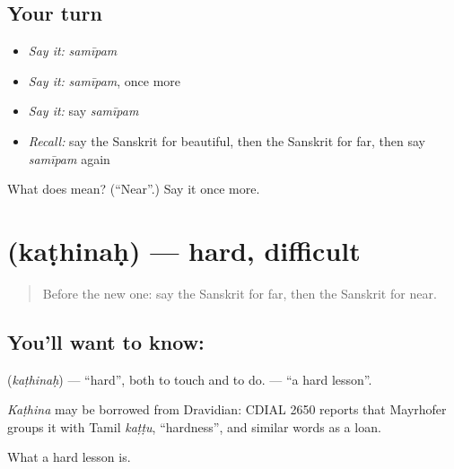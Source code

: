 \subsection*{Your turn}
\begin{itemize}
\raggedright
  \item \emph{Say it:} \emph{samīpam}
  \item \emph{Say it:} \emph{samīpam}, once more
  \item \emph{Say it:} say \emph{samīpam}
  \item \emph{Recall:} say the Sanskrit for beautiful, then the Sanskrit for far, then say \emph{samīpam} again
\end{itemize}

\begin{tcolorbox}[breakable,colback=teal!4,colframe=teal!35!black,title={Before you move on}]
What does  mean? (\textquotedblleft{}Near\textquotedblright{}.) Say it once more.
\end{tcolorbox}
\section[\texorpdfstring{\sk{कठिनः} (kaṭhinaḥ)}{कठिनः (kaṭhinaḥ)}]{ (kaṭhinaḥ) — hard, difficult}

\label{lesson:SA-C89-hard}



\begin{quote}
Before the new one: say the Sanskrit for far, then the Sanskrit for near.
\end{quote}

\subsection*{You'll want to know: }
\textbf{} (\emph{kaṭhinaḥ}) — \textquotedblleft{}hard\textquotedblright{}, both to touch and to do. \textbf{ } — \textquotedblleft{}a hard lesson\textquotedblright{}.

\begin{cousinweb}
\emph{Kaṭhina} may be borrowed from Dravidian: CDIAL 2650 reports that Mayrhofer groups it with Tamil \emph{kaṭṭu}, \textquotedblleft{}hardness\textquotedblright{}, and similar words as a loan.
\end{cousinweb}

\begin{grammarlens}[title={What you've built}]
What a hard lesson is.
\end{grammarlens}


